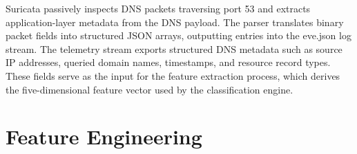 \documentclass[14pt, a4paper, oneside]{report}
\begin{document}
Suricata passively inspects DNS packets traversing port 53 and extracts application-layer metadata from the DNS payload. The parser translates binary packet fields into structured JSON arrays, outputting entries into the eve.json log stream. The telemetry stream exports structured DNS metadata such as source IP addresses, queried domain names, timestamps, and resource record types. These fields serve as the input for the feature extraction process, which derives the five-dimensional feature vector used by the classification engine.


\section{Feature Engineering}
\label{sec:feature_vectorization}
\end{document}
